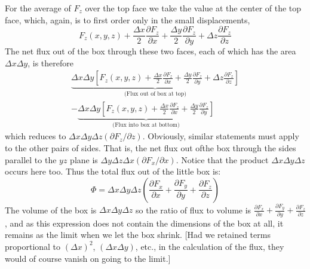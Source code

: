 For the average of $F_z$ over the top face we take the value at the
center of the top face, which, again, is to first order only in the small
displacements,
\begin{equation}
  F_z(x,y,z)+\frac{\Delta x}{2}\frac{\partial F_z}{\partial x}
            +\frac{\Delta y}{2}\frac{\partial F_z}{\partial y}
            +\Delta z\frac{\partial F_z}{\partial z}
\end{equation}
The net flux out of the box through these two faces, each of which has
the area $\Delta x\Delta y$, is therefore
\begin{multline}
  \underbrace{
    \Delta x\Delta y\left[
        F_z(x,y,z)+\frac{\Delta x}{2}\frac{\partial F_z}{\partial x}
                  +\frac{\Delta y}{2}\frac{\partial F_z}{\partial y}
                  +\Delta z\frac{\partial F_z}{\partial z}          
    \right]
  }_\text{(Flux out of box at top)}\\
  -
  \underbrace{
    \Delta x\Delta y\left[
        F_z(x,y,z)+\frac{\Delta x}{2}\frac{\partial F_z}{\partial x}
                  +\frac{\Delta y}{2}\frac{\partial F_z}{\partial y}
    \right]
  }_\text{(Flux into box at bottom)}
\end{multline}
which reduces to $\Delta x\Delta y\Delta z(\partial F_z/\partial z)$. Obviously, similar statements
must apply to the other pairs of sides. That is, the net flux out ofthe
box through the sides parallel to the $yz$ plane is $\Delta y \Delta z \Delta x (\partial F_x/\partial x)$.
Notice that the product $\Delta x\Delta y\Delta z$ occurs here too. Thus the total
flux out of the little box is:
\begin{equation}
  \Phi = \Delta x\Delta y\Delta z\left(\frac{\partial F_x}{\partial x}+
                        \frac{\partial F_y}{\partial y}+
                        \frac{\partial F_z}{\partial z}\right)
\end{equation}
The volume of the box is $\Delta x\Delta y\Delta z$ so the ratio of flux to volume is
$\frac{\partial F_x}{\partial x}+
                        \frac{\partial F_y}{\partial y}+
                        \frac{\partial F_z}{\partial z}$,
and as this expression does not contain the dimensions of the box at all, it remains
as the limit when we let the box shrink. [Had we retained terms proportional to
$(\Delta x)^2$, $(\Delta x\Delta y)$, etc.,
in the calculation of the flux, they would of course vanish on going to
the limit.]

